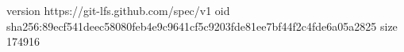 version https://git-lfs.github.com/spec/v1
oid sha256:89ecf541deec58080feb4e9c9641cf5c9203fde81ee7bf44f2c4fde6a05a2825
size 174916
